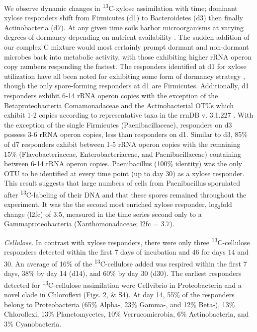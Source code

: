 We observe dynamic changes in \textsuperscript{13}C-xylose assimilation with time; dominant xylose responders shift from Firmicutes (d1) to Bacteroidetes (d3) then finally Actinobacteria (d7). At any given time soils harbor microorganisms at varying degrees of dormancy depending on nutrient availability \cite{Jones_2010}. The sudden addition of our complex C mixture would most certainly prompt dormant and non-dormant microbes back into metabolic activity, with those exhibiting higher rRNA operon copy numbers responding the fastest. The responders identified at d1 for xylose utilization have all been noted for exhibiting some form of dormancy strategy \cite{Jones_2010, Mulyukin_2009, Darcy_2011, Sachidanandham_2008, Finkel_2006, Rittershaus_2013, Tada_2013, Lay_2013}, though the only spore-forming responders at d1 are Firmicutes. Additionally, d1 responders exhibit 6-14 rRNA operon copies with the exception of the Betaproteobacteria Comamonadaceae and the Actinobacterial OTUs which exhibit 1-2 copies according to representative taxa in the rrnDB v. 3.1.227 \cite{18948294,11125085}. With the exception of the single Firmicutes (Paenibacillaceae), responders on d3 possess 3-6 rRNA operon copies, less than responders on d1. Similar to d3, 85\% of d7 responders exhibit between 1-5 rRNA operon copies with the remaining 15\% (Flavobacteriaceae, Enterobacteriaceae, and Paenibacillaceae) containing between 6-14 rRNA operon copies. Paenibacillus (100\% identity) was the only OTU to be identified at every time point (up to day 30) as a xylose responder. This result suggests that large numbers of cells from Paenibacillus sporulated after \textsuperscript{13}C-labeling of their DNA and that these spores remained throughout the experiment. It was the the second most enriched xylose responder, log\text$_{2}$fold change (l2fc) of 3.5, measured in the time series second only to a Gammaproteobacteria (Xanthomonadaceae; l2fc = 3.7).


\textit{Cellulose}. In contrast with xylose responders, there were only three \textsuperscript{13}C-cellulose responders detected within the first 7 days of incubation and 46 for days 14 and 30. An average of 16\% of the \textsuperscript{13}C-cellulose added was respired within the first 7 days, 38\% by day 14 (d14), and 60\% by day 30 (d30). The earliest responders detected for \textsuperscript{13}C-cellulose assimilation were Cellvibrio in Proteobacteria and a novel clade in Chloroflexi (\href{https://www.authorea.com/users/3537/articles/3612/master/file/figures/l2fc_fig1/l2fc_fig.pdf}{Figs. 2}, \href{https://authorea.com/users/3537/articles/8459/master/file/figures/l2fc_fig_pVal/l2fc_fig_pVal.png}{& S4}). At day 14, 55\% of the responders belong to Proteobacteria (65\% Alpha-, 23\% Gamma-, and 12\% Beta-), 13\% Chloroflexi, 13\% Planctomycetes, 10\% Verrucomicrobia, 6\% Actinobacteria, and 3\% Cyanobacteria.

